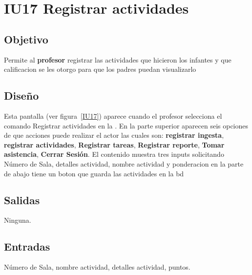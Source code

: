 \newpage
\section{IU17 Registrar actividades}

\subsection{Objetivo}
	Permite al {\bf profesor} registrar las actividades que hicieron los infantes y que calificacion se les otorgo para que los padres puedan visualizarlo

\subsection{Diseño}
	 Esta pantalla  (ver figura~\ref{IU17}) aparece cuando el            profesor selecciona el comando Registrar actividades en la . 
         En la parte superior aparecen seis opciones de que acciones puede realizar el actor las cuales son: {\bf registrar ingesta}, {\bf registrar actividades}, {\bf Registrar tareas}, {\bf Registrar reporte}, {\bf Tomar asistencia}, {\bf Cerrar Sesión}. 
         El contenido muestra tres inputs solicitando Número de Sala, detalles actividad, nombre actividad y ponderacion
         en la parte de abajo tiene un boton que guarda las actividades en la bd
         

\subsection{Salidas}

	Ninguna.

\subsection{Entradas}
Número de Sala, nombre actividad, detalles actividad, puntos.

